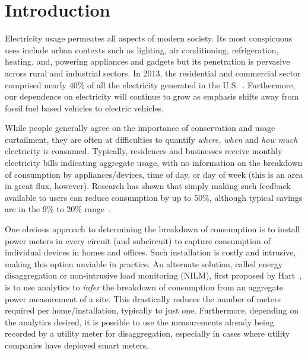 \section{Introduction}
Electricity usage permeates all aspects of modern society.
Its most conspicuous
uses include urban contexts such as
lighting, air conditioning, refrigeration, heating, and, powering
appliances and gadgets but its penetration is pervasive across rural
and industrial sectors.
In 2013, the residential and commercial sector
comprised nearly 40\% of all the electricity generated in the U.S.~\cite{energydatabook2011}.
Furthermore, our dependence on electricity will continue to grow
as emphasis shifts away from fossil fuel based vehicles to electric
vehicles.

While people generally agree on the importance of conservation and
usage curtailment, they are often at difficulties to quantify 
{\em where, when} and {\em how much} electricity is consumed.
Typically, residences and businesses receive
monthly electricity bills indicating aggregate usage, with no information on
the breakdown of consumption by appliances/devices, time of day, or day of
week (this is an area in great flux, however). Research has 
shown that simply making such feedback available to users
can reduce consumption by up to 50\%, although typical savings
are in the 9\% to 20\% range~\cite{energydatabook2011}.



One obvious approach to determining the breakdown of consumption is to install
power meters in every circuit (and subcircuit)
to capture consumption of individual devices in homes and
offices. Such installation is costly and intrusive, making 
this option unviable in practice. 
An alternate
solution, called energy disaggregation or non-intrusive load monitoring
(NILM),
first proposed by Hart~\cite{hart1992}, is to use analytics to 
{\em infer} the breakdown of consumption from an aggregate 
power measurement of a
site. This drastically reduces the number of meters required per 
home/installation, typically to just one. Furthermore, depending on the analytics desired, it is possible to
use the measurements already being recorded by a utility meter for
disaggregation, especially in cases where utility companies have deployed
smart meters.

